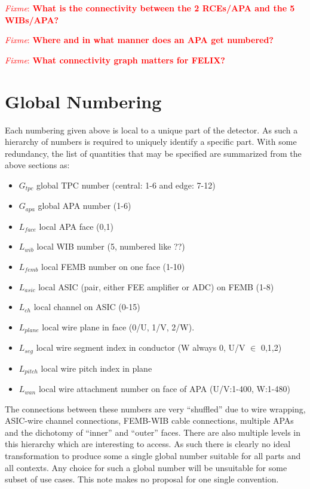 \documentclass[pdftex,12pt,letter]{article}
\newcommand{\fixme}[1]{\textcolor{red}{\textit{Fixme}: \textbf{#1}}}
\begin{document}
\fixme{What is the connectivity between the 2 RCEs/APA and the 5 WIBs/APA?}

\fixme{Where and in what manner does an APA get numbered?}

\fixme{What connectivity graph matters for FELIX?}

\section{Global Numbering}

Each numbering given above is local to a unique part of the detector.
As such a hierarchy of numbers is required to uniquely identify a
specific part.  With some redundancy, the list of quantities that may
be specified are summarized from the above sections as:

\begin{itemize}
\item $G_{tpc}$ global TPC number (central: 1-6 and edge: 7-12)
\item $G_{apa}$ global APA number (1-6)
\item $L_{face}$ local APA face (0,1)
\item $L_{wib}$ local WIB number (5, numbered like ??)
\item $L_{femb}$ local FEMB number on one face (1-10)
\item $L_{asic}$ local ASIC (pair, either FEE amplifier or ADC) on FEMB (1-8)
\item $L_{ch}$ local channel on ASIC (0-15)
\item $L_{plane}$ local wire plane in face (0/U, 1/V, 2/W).
\item $L_{seg}$ local wire segment index in conductor (W always 0, U/V $\in$ 0,1,2)
\item $L_{pitch}$ local wire pitch index in plane
\item $L_{wan}$ local wire attachment number on face of APA (U/V:1-400, W:1-480)
\end{itemize}

The connections between these numbers are very ``shuffled'' due to
wire wrapping, ASIC-wire channel connections, FEMB-WIB cable
connections, multiple APAs and the dichotomy of ``inner'' and
``outer'' faces.  There are also multiple levels in this hierarchy
which are interesting to access.  As such there is clearly no ideal
transformation to produce some a single global number suitable for all
parts and all contexts.  Any choice for such a global number will be
unsuitable for some subset of use cases.  This note makes no proposal
for one single convention.
\end{document}
